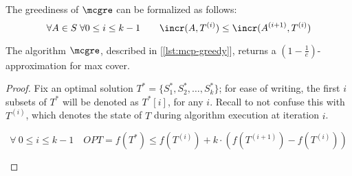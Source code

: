 \begin{proposition}\label{prop:mcp-greediness}
    The greediness of $\mcgre$ can be formalized as follows:
    \[
        \forall A \in S\; \forall 0 \leq i \leq k - 1 \qquad \incr(A, T^{(i)}) \leq \incr(A^{(i + 1)}, T^{(i)})
    \]
\end{proposition}

\begin{theorem}\label{thm:mcp-greedy}
    The algorithm $\mcgre$, described in [\ref{lst:mcp-greedy}], returns a $\left(1-\frac{1}{e}\right)$-approximation for max cover.
\end{theorem}

\begin{proof}
    Fix an optimal solution $T^* = \{S_1^*, S_2^*, \ldots, S_k^*\}$; for ease of writing, the first $i$ subsets of $T^*$ will be denoted as $T^*[i]$, for any $i$. Recall to not confuse this with $T^{(i)}$, which denotes the state of $T$ during algorithm execution at iteration $i$.

    \begin{lemma}\label{l:mcp-1}
        \[
            \forall\ 0 \leq i \leq k - 1 \quad OPT = f(T^*) \leq f(T^{(i)}) + k \cdot \left( f(T^{(i + 1)}) - f(T^{(i)}) \right)
        \]
    \end{lemma}


\end{proof}
